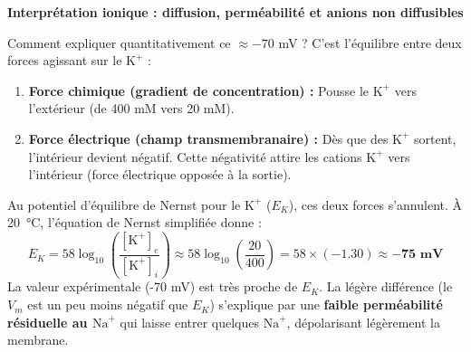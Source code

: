 \documentclass[11pt]{article}
\newcommand{\cle}[1]{{\popxbold\color{popdark}#1}}
\begin{document}
\textbf{Interprétation ionique : diffusion, perméabilité et anions non diffusibles}\par

Comment expliquer quantitativement ce $\approx -70$ mV ? C'est l'équilibre entre deux forces agissant sur le $\text{K}^+$ :

\begin{enumerate}
    \item \textbf{Force chimique (gradient de concentration) :} Pousse le $\text{K}^+$ vers l'extérieur (de 400 mM vers 20 mM).
    \item \textbf{Force électrique (champ transmembranaire) :} Dès que des $\text{K}^+$ sortent, l'intérieur devient négatif. Cette négativité attire les cations $\text{K}^+$ vers l'intérieur (force électrique opposée à la sortie).
\end{enumerate}
Au \cle{potentiel d'équilibre de Nernst pour le $\text{K}^+$ ($E_K$)}, ces deux forces s'annulent. À \SI{20}{\celsius}, l'équation de Nernst simplifiée donne :
\[
E_K = 58 \log_{10}\left(\frac{[\text{K}^+]_e}{[\text{K}^+]_i}\right) \approx 58 \log_{10}\left(\frac{20}{400}\right) = 58 \times (-1.30) \approx \mathbf{-75 \text{ mV}}
\]
La valeur expérimentale (-70 mV) est très proche de $E_K$. La légère différence (le $V_m$ est un peu moins négatif que $E_K$) s'explique par une \textbf{faible perméabilité résiduelle au $\text{Na}^+$} qui laisse entrer quelques $\text{Na}^+$, dépolarisant légèrement la membrane.
\end{document}
